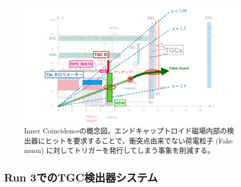 \begin{figure} 
    \centering
    \includegraphics[width=16cm]{fig/Intro/TGC_Inner_concept.pdf}
    \caption[フェイクトリガーの例]{Inner Coincidenceの概念図\cite{mt_kawamoto}。エンドキャップトロイド磁場内部の検出器にヒットを要求することで、衝突点由来でない荷電粒子 (Fake muon) に対してトリガーを発行してしまう事象を削減する。}
    \label{TGC_Inner_concept}
\end{figure}

    \subsection{Run 3でのTGC検出器システム}

